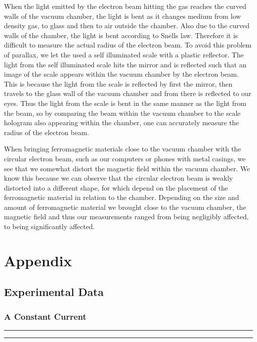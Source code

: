 \documentclass[a4paper,12pt]{article}
\begin{document}
When the light emitted by the electron beam hitting the gas reaches the curved walls of the vacuum chamber, the light is bent as it changes medium from low density gas, to glass
and then to air outside the chamber. Also due to the curved walls of the chamber, the light is bent according to Snells law. Therefore it is difficult to measure the actual radius 
of the electron beam. To avoid this problem of parallax, we let the used a self illuminated scale with a plastic reflector. 
The light from the self illuminated scale hits the mirror and is reflected such that an image of the scale appears within the vacuum chamber by the electron beam. This is because the 
light from the scale is reflected by first the mirror, then travels to the glass wall of the vacuum chamber and from there is reflected to our eyes. Thus the light from the scale is 
bent in the same manner as the light from the beam, so by comparing the beam within the vacuum chamber to the scale hologram also appearing within the chamber, one can accurately 
measure the radius of the electron beam.

When bringing ferromagnetic materials close to the vacuum chamber with the circular electron beam, such as our computers or phones with metal casings, we see that we somewhat
distort the magnetic field within the vacuum chamber. We know this because we can observe that the circular electron beam is weakly distorted into a different shape, for which depend
on the placement of the ferromagnetic material in relation to the chamber. Depending on the size and amount of ferromagnetic material we brought close to the vacuum chamber, 
the magnetic field and thus our measurements ranged from being negligibly affected, to being significantly affected. 


\pagebreak

\appendix

\section{Appendix}

\subsection{Experimental Data}

\subsubsection*{A Constant Current}

\noindent\rule{\textwidth}{1pt}

\noindent\rule{\textwidth}{1pt}
\end{document}
